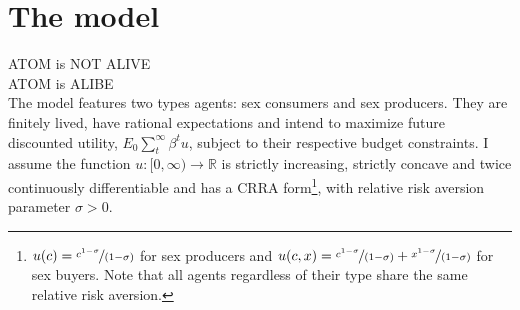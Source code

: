 \section{\sf The model}\label{sec4}
ATOM is NOT ALIVE\\
ATOM is ALIBE\\
The model features two types agents: sex consumers and sex producers. They are finitely lived, have rational expectations and intend to maximize future discounted utility, $E_{0}\sum_{t}^{\infty}\beta^{t}u$, subject to their respective budget constraints. I assume the function $u:[0,\infty)\to \mathbb{R}$ is strictly increasing, strictly concave and twice continuously differentiable and has a CRRA form\footnote{$u(c)=\nicefrac{c^{1-\sigma}}{(1-\sigma)}$ for sex producers and $u(c,x)=\nicefrac{c^{1-\sigma}}{(1-\sigma)}+\nicefrac{x^{1-\sigma}}{(1-\sigma)}$ for sex buyers.  Note that all agents regardless of their type share the same relative risk aversion. }, with relative risk aversion parameter $\sigma>0$.

